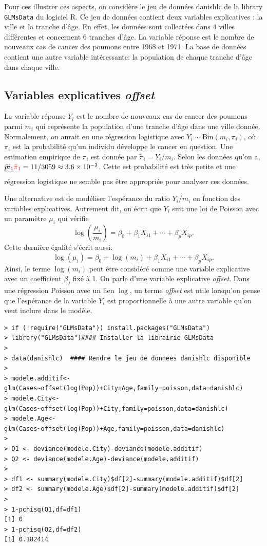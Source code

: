 \documentclass[11pt]{article}
\begin{document}
\noindent Pour ces illustrer ces aspects, on consid\`ere le jeu de donn\'ees \textsf{danishlc} de la library \texttt{GLMsData} du logiciel \textrm{R}. Ce jeu de donn\'ees contient deux variables explicatives : la ville et la tranche d'\^age. En effet, les donn\'ees sont collect\'ees dans 4 villes diff\'erentes et concernent 6 tranches d'\^age. La variable r\'eponse est le nombre de nouveaux cas de cancer des poumons entre 1968 et 1971. La base de donn\'ees contient une autre variable int\'eressante: la population de chaque tranche d'\^age dans chaque ville. 

\subsection{Variables explicatives {\it offset}}

La variable r\'eponse $Y_i$ est le nombre de nouveaux cas de cancer des poumons parmi $m_i$ qui repr\'esente la population d'une tranche d'\^age dans une ville donn\'ee. Normalement, on aurait eu une r\'egression logistique avec $Y_i \sim \mbox{Bin}(m_i,\pi_i)$, o\`u $\pi_i$ est la probabilit\'e qu'un individu d\'eveloppe le cancer en question. Une estimation empirique de $\pi_i$ est donn\'ee par $\tilde\pi_i=Y_i/m_i$. Selon les donn\'ees qu'on a, $\sout{\tilde pi_1}\textcolor{red}{\tilde\pi_1}=11/3059 \approx 3.6 \times 10^{-3}$. Cette est probabilit\'e est tr\`es petite et une r\'egression logistique ne semble pas \^etre appropri\'ee pour analyser ces donn\'ees. 

\noindent Une alternative est de mod\'eliser l'esp\'erance du ratio $Y_i/m_i$ en fonction des variables explicatives. Autrement dit, on \'ecrit que $Y_i$ suit une loi de Poisson avec un param\`etre $\mu_i$ qui v\'erifie
$$\log(\frac{\mu_i}{m_i}) = \beta_0+\beta_1 X_{i1}+\cdots+\beta_p X_{ip}.$$
\noindent Cette derni\`ere \'egalit\'e s'\'ecrit aussi:
$$\log(\mu_i) = \beta_0+\log(m_i)+\beta_1 X_{i1}+\cdots+\beta_p X_{ip}.$$
\noindent Ainsi, le terme $\log(m_i)$ peut \^etre consid\'er\'e comme une variable explicative avec un coefficient $\beta_j$ fix\'e \`a 1. On parle d'une variable explicative {\it offset}. Dans une r\'egression Poisson avec un lien $\log$, un terme {\it offset} est utile lorsqu'on pense que l'esp\'erance de la variable $Y_i$ est proportionnelle \`a une autre variable qu'on veut inclure dans le mod\`ele.
 
\begin{verbatim}
> if (!require("GLMsData")) install.packages("GLMsData")
> library("GLMsData")#### Installer la librairie GLMsData
> 
> data(danishlc)  #### Rendre le jeu de donnees danishlc disponible
> 
> modele.additif<-glm(Cases~offset(log(Pop))+City+Age,family=poisson,data=danishlc)
> modele.City<-glm(Cases~offset(log(Pop))+City,family=poisson,data=danishlc)
> modele.Age<-glm(Cases~offset(log(Pop))+Age,family=poisson,data=danishlc)
> 
> Q1 <- deviance(modele.City)-deviance(modele.additif)
> Q2 <- deviance(modele.Age)-deviance(modele.additif)
> 
> df1 <- summary(modele.City)$df[2]-summary(modele.additif)$df[2]
> df2 <- summary(modele.Age)$df[2]-summary(modele.additif)$df[2]
> 
> 1-pchisq(Q1,df=df1)
[1] 0
> 1-pchisq(Q2,df=df2)
[1] 0.182414
\end{verbatim} 
\end{document}
